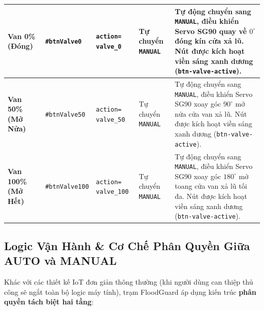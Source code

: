 \begin{longtable}{|>{\raggedright\arraybackslash}p{2.2cm}|>{\raggedright\arraybackslash}p{2.85cm}|>{\raggedright\arraybackslash}p{2.5cm}|>{\centering\arraybackslash}p{1.8cm}|>{\raggedright\arraybackslash}p{5.15cm}|}
\textbf{Van 0\% (Đóng)} & \texttt{\#btnValve0} & \texttt{action=} \newline \texttt{valve\_0} & Tự chuyển \texttt{MANUAL} & Tự động chuyển sang \texttt{MANUAL}, điều khiển Servo SG90 quay về $0^\circ$ đóng kín cửa xả lũ. Nút được kích hoạt viền sáng xanh dương (\texttt{btn-valve-active}). \\ \hline

\textbf{Van 50\% (Mở Nửa)} & \texttt{\#btnValve50} & \texttt{action=} \newline \texttt{valve\_50} & Tự chuyển \texttt{MANUAL} & Tự động chuyển sang \texttt{MANUAL}, điều khiển Servo SG90 xoay góc $90^\circ$ mở nửa cửa van xả lũ. Nút được kích hoạt viền sáng xanh dương (\texttt{btn-valve-active}). \\ \hline

\textbf{Van 100\% (Mở Hết)} & \texttt{\#btnValve100} & \texttt{action=} \newline \texttt{valve\_100} & Tự chuyển \texttt{MANUAL} & Tự động chuyển sang \texttt{MANUAL}, điều khiển Servo SG90 xoay góc $180^\circ$ mở toang cửa van xả lũ tối đa. Nút được kích hoạt viền sáng xanh dương (\texttt{btn-valve-active}). \\ \hline
\end{longtable}
\endgroup

\subsection{Logic Vận Hành \& Cơ Chế Phân Quyền Giữa AUTO và MANUAL}

Khác với các thiết kế IoT đơn giản thông thường (khi người dùng can thiệp thủ công sẽ ngắt toàn bộ logic máy tính), trạm FloodGuard áp dụng kiến trúc \textbf{phân quyền tách biệt hai tầng}:

